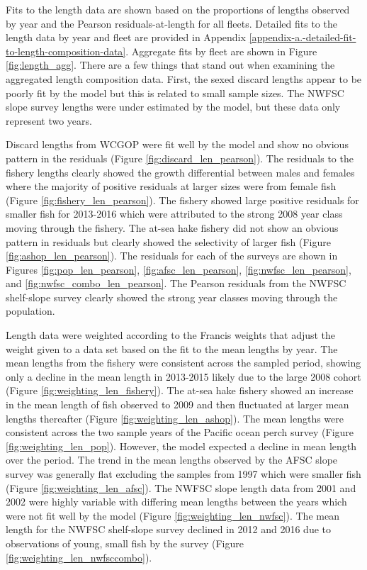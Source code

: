 \documentclass[12pt,]{article}
\begin{document}
Fits to the length data are shown based on the proportions of lengths
observed by year and the Pearson residuals-at-length for all fleets.
Detailed fits to the length data by year and fleet are provided in
Appendix \ref{appendix-a.-detailed-fit-to-length-composition-data}.
Aggregate fits by fleet are shown in Figure \ref{fig:length_agg}. There
are a few things that stand out when examining the aggregated length
composition data. First, the sexed discard lengths appear to be poorly
fit by the model but this is related to small sample sizes. The NWFSC
slope survey lengths were under estimated by the model, but these data
only represent two years.

Discard lengths from WCGOP were fit well by the model and show no
obvious pattern in the residuals (Figure \ref{fig:discard_len_pearson}).
The residuals to the fishery lengths clearly showed the growth
differential between males and females where the majority of positive
residuals at larger sizes were from female fish (Figure
\ref{fig:fishery_len_pearson}). The fishery showed large positive
residuals for smaller fish for 2013-2016 which were attributed to the
strong 2008 year class moving through the fishery. The at-sea hake
fishery did not show an obvious pattern in residuals but clearly showed
the selectivity of larger fish (Figure \ref{fig:ashop_len_pearson}). The
residuals for each of the surveys are shown in Figures
\ref{fig:pop_len_pearson}, \ref{fig:afsc_len_pearson},
\ref{fig:nwfsc_len_pearson}, and \ref{fig:nwfsc_combo_len_pearson}. The
Pearson residuals from the NWFSC shelf-slope survey clearly showed the
strong year classes moving through the population.

Length data were weighted according to the Francis weights that adjust
the weight given to a data set based on the fit to the mean lengths by
year. The mean lengths from the fishery were consistent across the
sampled period, showing only a decline in the mean length in 2013-2015
likely due to the large 2008 cohort (Figure
\ref{fig:weighting_len_fishery}). The at-sea hake fishery showed an
increase in the mean length of fish observed to 2009 and then fluctuated
at larger mean lengths thereafter (Figure
\ref{fig:weighting_len_ashop}). The mean lengths were consistent across
the two sample years of the Pacific ocean perch survey (Figure
\ref{fig:weighting_len_pop}). However, the model expected a decline in
mean length over the period. The trend in the mean lengths observed by
the AFSC slope survey was generally flat excluding the samples from 1997
which were smaller fish (Figure \ref{fig:weighting_len_afsc}). The NWFSC
slope length data from 2001 and 2002 were highly variable with differing
mean lengths between the years which were not fit well by the model
(Figure \ref{fig:weighting_len_nwfsc}). The mean length for the NWFSC
shelf-slope survey declined in 2012 and 2016 due to observations of
young, small fish by the survey (Figure
\ref{fig:weighting_len_nwfsccombo}).
\end{document}

